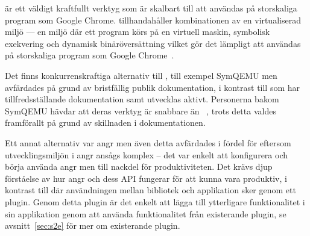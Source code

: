 \stoe{} är ett väldigt kraftfullt verktyg som är skalbart till att användas på
storskaliga program som Google Chrome. \stoe{} tillhandahåller
kombinationen av en virtualiserad miljö — en miljö där ett program körs på en
virtuell maskin, symbolisk exekvering och dynamisk binäröversättning vilket gör
det lämpligt att användas på storskaliga program som Google Chrome~\cite{s2e}.

Det finns konkurrenskraftiga alternativ till \stoe{}, till exempel SymQEMU men
avfärdades på grund av bristfällig publik dokumentation, i kontrast till \stoe{}
som har tillfredsställande dokumentation samt utvecklas aktivt. Personerna bakom
SymQEMU hävdar att deras verktyg är snabbare än \stoe{}~\cite{symqemu}, trots detta valdes \stoe{}
framförallt på grund av skillnaden i dokumentationen.

Ett annat alternativ var angr men även detta avfärdades i fördel för \stoe{}
eftersom utvecklingsmiljön i angr ansågs komplex – det var enkelt att konfigurera och börja
använda angr men till nackdel för produktiviteten. Det krävs djup förståelse av
hur angr och dess API fungerar för att kunna vara produktiv, i kontrast till
\stoe{} där användningen mellan bibliotek och applikation sker genom ett plugin.
Genom detta plugin är det enkelt att lägga till ytterligare funktionalitet i sin
applikation genom att använda funktionalitet från existerande plugin, se
avsnitt~\ref{sec:s2e} för mer om existerande plugin. 

